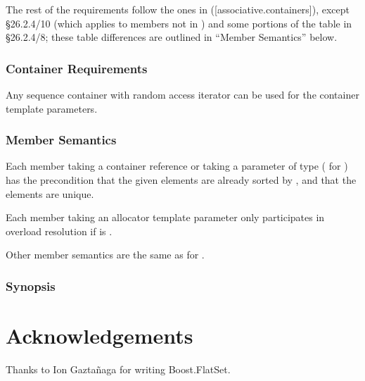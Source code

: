 The rest of the requirements follow the ones in ([associative.containers]),
except \S26.2.4/10 (which applies to members not in
) and some portions of the table in \S26.2.4/8; these table
differences are outlined in ``Member Semantics'' below.

\subsubsection{Container Requirements}

Any sequence container with random access iterator can be used for the
container template parameters.

\subsubsection{Member Semantics}

Each member taking a container reference or taking a parameter of type
 ( for ) has the
precondition that the given elements are already sorted by , and
that the elements are unique.

Each member taking an allocator template parameter only participates in
overload resolution if  is
.

Other member semantics are the same as for .

\subsubsection{ Synopsis}




\section{Acknowledgements}

Thanks to Ion Gazta\~{n}aga for writing Boost.FlatSet.
